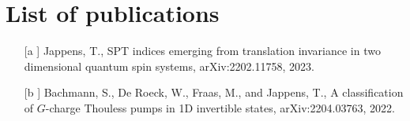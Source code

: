 \chapter{List of publications}

\begin{itemize}
	\label{myFirstPaper}
	\item[[a]] Jappens, T., SPT indices emerging from translation invariance in two dimensional quantum spin systems, arXiv:2202.11758, 2023.
	\label{mySecondPaper}
	\item[[b]] Bachmann, S., De Roeck, W., Fraas, M., and Jappens, T., A classification of $G$-charge Thouless pumps in 1D invertible states, arXiv:2204.03763, 2022.
\end{itemize}